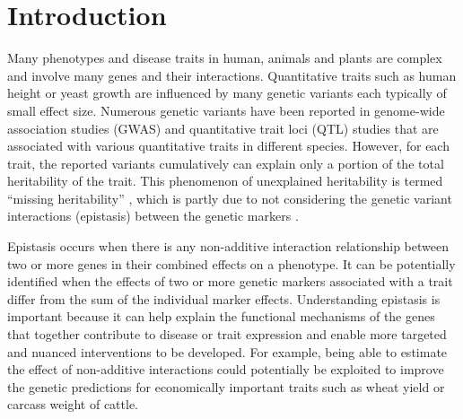 \documentclass[preprint,12pt,3p]{elsarticle}
\begin{document}
\linenumbers
\section{Introduction}
Many phenotypes and disease traits in human, animals and plants are complex and involve many genes and their
interactions.  Quantitative traits such as human height or yeast growth are influenced by many genetic variants each
typically of small effect size.  Numerous genetic variants have been reported in genome-wide association studies (GWAS)
and quantitative trait loci (QTL) studies that are associated with various quantitative traits in different
species. However, for each trait, the reported variants cumulatively can explain only a portion of the total
heritability of the trait.  This phenomenon of unexplained heritability is termed ``missing heritability''
\cite[]{Maher2008}, which is partly due to not considering the genetic variant interactions (epistasis) between the
genetic markers \cite[]{Zuk.et.al.2012}.

Epistasis occurs when there is any non-additive interaction relationship between two or more genes in their combined
effects on a phenotype. It can be potentially identified when the effects of two or more genetic markers associated with
a trait differ from the sum of the individual marker effects. Understanding epistasis is important because it can help
explain the functional mechanisms of the genes that together contribute to disease or trait expression and enable more
targeted and nuanced interventions to be developed. For example, being able to estimate the effect of non-additive
interactions could potentially be exploited to improve the genetic predictions \cite[]{Ansarifar.et.al.2020} for
economically important traits such as wheat yield or carcass weight of cattle.
\end{document}
